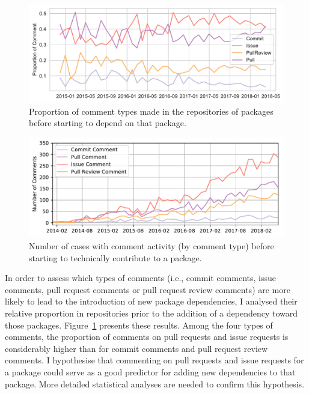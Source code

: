 \begin{figure}[!tbh]
\vspace{-0.3cm}
    \includegraphics[width=0.9\columnwidth]{Photos/RQ22.pdf} 
\vspace{-0.3cm}
    \caption{Proportion of comment types made in the repositories of packages before starting to depend on that package.}
    \label{fig:fig2}
    
\end{figure}

\begin{figure}[!tbh]
\vspace{-0.3cm}
    \includegraphics[width=0.9\columnwidth]{Photos/RQ3.pdf} 
\vspace{-0.3cm}
    \caption{Number of cases with comment activity (by comment type) before starting to technically contribute to a package.}
    \label{fig:fig3}
\vspace{-0.2cm}
\end{figure}


In order to assess which types of comments (i.e., commit comments, issue comments, pull request comments or pull request review comments) are more likely to lead to the introduction of new package dependencies, I analysed their relative proportion in repositories prior to the addition of a dependency toward those packages. Figure~\ref{fig:fig2} presents these results. 
Among the four types of comments, the proportion of comments on pull requests and issue requests is considerably higher than for commit comments and pull request review comments. I hypothesise that commenting on pull requests and issue requests for a package could serve as a good predictor for adding new dependencies to that package. More detailed statistical analyses are needed to confirm this hypothesis.


